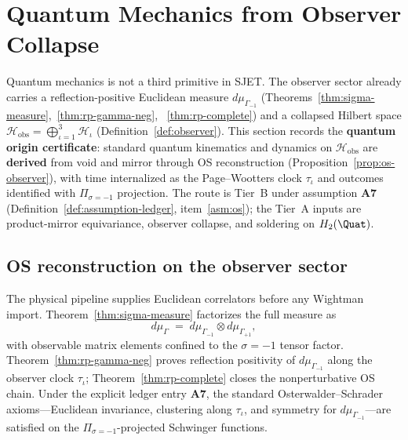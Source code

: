 \section{Quantum Mechanics from Observer Collapse}
\label{sec:quantum-origin}

Quantum mechanics is not a third primitive in SJET. The observer sector
already carries a reflection-positive Euclidean measure $d\mu_{\Gamma_{-1}}$
(Theorems~\ref{thm:sigma-measure},~\ref{thm:rp-gamma-neg},
~\ref{thm:rp-complete}) and a collapsed Hilbert space
$\mathcal{H}_{\mathrm{obs}}=\bigoplus_{\iota=1}^3\mathcal{H}_\iota$
(Definition~\ref{def:observer}). This section records the \textbf{quantum
origin certificate}: standard quantum kinematics and dynamics on
$\mathcal{H}_{\mathrm{obs}}$ are \textbf{derived} from void and mirror through
OS reconstruction (Proposition~\ref{prop:os-observer}), with time internalized
as the Page--Wootters clock $\tau_\iota$ and outcomes identified with
$\Pi_{\sigma=-1}$ projection. The route is Tier~B under assumption
\textbf{A7} (Definition~\ref{def:assumption-ledger}, item~\ref{asm:os}); the
Tier~A inputs are product-mirror equivariance, observer collapse, and soldering
on $H_2(\Quat)$.

\subsection{OS reconstruction on the observer sector}

The physical pipeline supplies Euclidean correlators before any Wightman
import. Theorem~\ref{thm:sigma-measure} factorizes the full measure as
\begin{equation}\label{eq:qm-gamma-split}
  d\mu_\Gamma
  \;=\;
  d\mu_{\Gamma_{-1}}\otimes d\mu_{\Gamma_{+1}},
\end{equation}
with observable matrix elements confined to the $\sigma=-1$ tensor factor.
Theorem~\ref{thm:rp-gamma-neg} proves reflection positivity of
$d\mu_{\Gamma_{-1}}$ along the observer clock $\tau_\iota$; Theorem~\ref{thm:rp-complete}
closes the nonperturbative OS chain. Under the explicit ledger entry
\textbf{A7}, the standard Osterwalder--Schrader axioms---Euclidean invariance,
clustering along $\tau_\iota$, and symmetry for $d\mu_{\Gamma_{-1}}$---are
satisfied on the $\Pi_{\sigma=-1}$-projected Schwinger functions.

